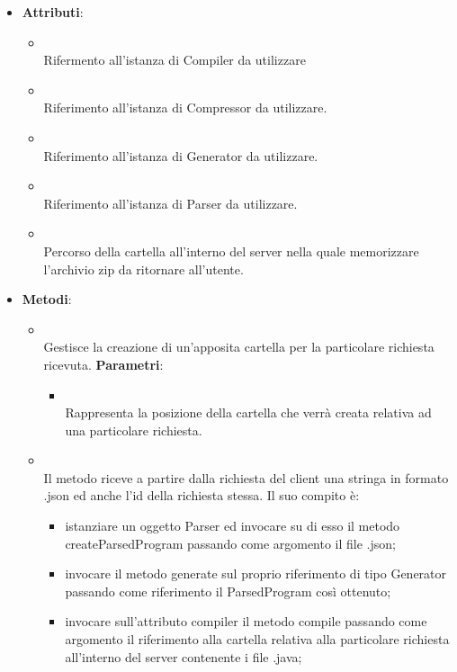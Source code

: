\begin{itemize}
\item \textbf{Attributi}:
\begin{itemize}
\item {}
\\ Rifermento all'istanza di Compiler da utilizzare
\item {}
\\ Riferimento all'istanza di Compressor da utilizzare.
\item {}
\\ Riferimento all'istanza di Generator da utilizzare.
\item {}
\\ Riferimento all'istanza di Parser da utilizzare.
\item {}
\\ Percorso della cartella all'interno del server nella quale memorizzare l'archivio zip da ritornare all'utente.
\end{itemize}
\item \textbf{Metodi}:
\begin{itemize}
\item {}
\\ Gestisce la creazione di un'apposita cartella per la particolare richiesta ricevuta.
\textbf{Parametri}:
\begin{itemize}
\item {}
\\ Rappresenta la posizione della cartella che verrà creata relativa ad una particolare richiesta.
\end{itemize}
\item {}
\\ Il metodo riceve a partire dalla richiesta del client una stringa in formato .json ed anche l'id della richiesta stessa.
Il suo compito è:
\begin{itemize}
\item istanziare un oggetto Parser ed invocare su di esso il metodo createParsedProgram passando come argomento il file .json;
\item invocare il metodo generate sul proprio riferimento di tipo Generator passando come riferimento il ParsedProgram così ottenuto;
\item invocare sull'attributo compiler il metodo compile passando come argomento il riferimento alla cartella relativa alla particolare richiesta all'interno del server contenente i file .java;

\end{itemize}
\end{itemize}
\end{itemize}
